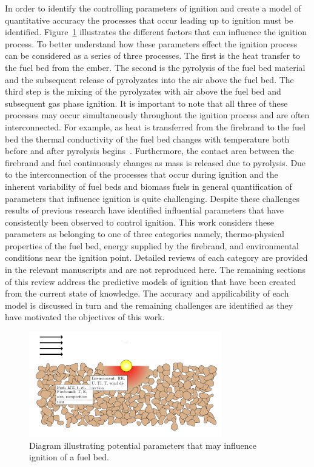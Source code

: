    
    In order to identify the controlling parameters of ignition and create a model of quantitative accuracy the processes that occur leading up to ignition must be identified. Figure~\ref{fig:ignitionDiagram} illustrates the different factors that can influence the ignition process. To better understand how these parameters effect the ignition process can be considered as a series of three processes.  The first is the heat transfer to the fuel bed from the ember. The second is the pyrolysis of the fuel bed material and the subsequent release of pyrolyzates into the air above the fuel bed. The third step is the mixing of the pyrolyzates with air above the fuel bed and subsequent gas phase ignition. It is important to note that all three of these processes may occur simultaneously throughout the ignition process and are often interconnected. For example, as heat is transferred from the firebrand to the fuel bed the thermal conductivity of the fuel bed changes with temperature both before and after pyrolysis begins~\cite{Fjellerup2003}. Furthermore, the contact area between the firebrand and fuel continuously changes as mass is released due to pyrolysis. Due to the interconnection of the processes that occur during ignition and the inherent variability of fuel beds and biomass fuels in general quantification of parameters that influence ignition is quite challenging. Despite these challenges results of previous research have identified influential parameters that have consistently been observed to control ignition. This work considers these parameters as belonging to one of three categories namely, thermo-physical properties of the fuel bed, energy supplied by the firebrand, and environmental conditions near the ignition point. Detailed reviews of each category are provided in the relevant manuscripts and are not reproduced here. The remaining sections of this review address the predictive models of ignition that have been created from the current state of knowledge. The accuracy and appilicability of each model is discussed in turn and the remaining challenges are identified as they have motivated the objectives of this work. 
        \begin{figure}[hpbt]
            \centering
                \includegraphics[width=0.75\textwidth]{Figures/dissertationBed.pdf}
            \caption{Diagram illustrating potential parameters that may influence ignition of a fuel bed.}
            \label{fig:ignitionDiagram}
        \end{figure}
    
